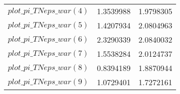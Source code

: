 \begin{center}
\begin{longtable}{lcc}
$plot\_pi\_TN eps\_war (4)   $	 & 	      1.3539988	 & 	      1.9798305 \\ 
$plot\_pi\_TN eps\_war (5)   $	 & 	      1.4207934	 & 	      2.0804963 \\ 
$plot\_pi\_TN eps\_war (6)   $	 & 	      2.3290339	 & 	      2.0840032 \\ 
$plot\_pi\_TN eps\_war (7)   $	 & 	      1.5538284	 & 	      2.0124737 \\ 
$plot\_pi\_TN eps\_war (8)   $	 & 	      0.8394189	 & 	      1.8870944 \\ 
$plot\_pi\_TN eps\_war (9)   $	 & 	      1.0729401	 & 	      1.7272161 \\ 
\end{longtable}
 \end{center}
